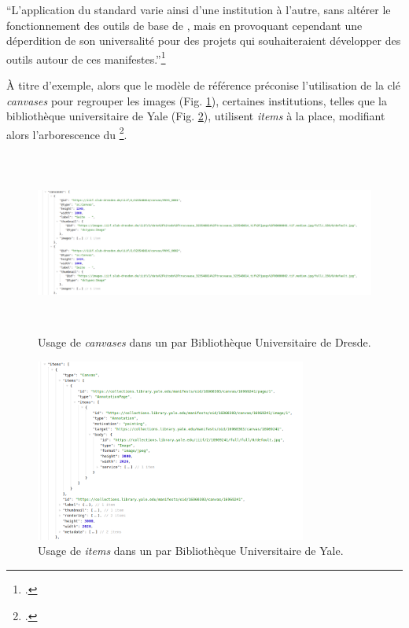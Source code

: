 \begin{kwote}
``L'application du standard varie ainsi d'une institution à l'autre, sans
altérer le fonctionnement des outils de base de \iiif, mais en provoquant
cependant une déperdition de son universalité pour des projets qui
souhaiteraient développer des outils autour de ces
manifestes.''\footcite[p.25]{norindr_traitement_2023}
\end{kwote}   

À titre d'exemple, alors que le modèle de référence préconise
l'utilisation de la clé \textit{canvases} pour regrouper les images
(Fig. \ref{fig:dresde}), certaines institutions, telles que la
bibliothèque universitaire de Yale (Fig. \ref{fig:yale}),
utilisent \textit{items} à la place, modifiant alors l'arborescence du \man\footcite[p.25]{norindr_traitement_2023}.

          \begin{figure}[H]
          \begin{center}
          \includegraphics[height=6cm]{figues/dresde_manifest.png}
          \end{center}
          \caption{Usage de \textit{canvases} dans un \man \iiif par Bibliothèque Universitaire de Dresde.}
          \label{fig:dresde} \end{figure}

          \begin{figure}[H]
          \begin{center}
          \includegraphics[height=6cm]{figues/yale_manifest.png}
          \end{center}
          \caption{Usage de \textit{items} dans un \man \iiif par Bibliothèque Universitaire de Yale.}
          \label{fig:yale} \end{figure}

